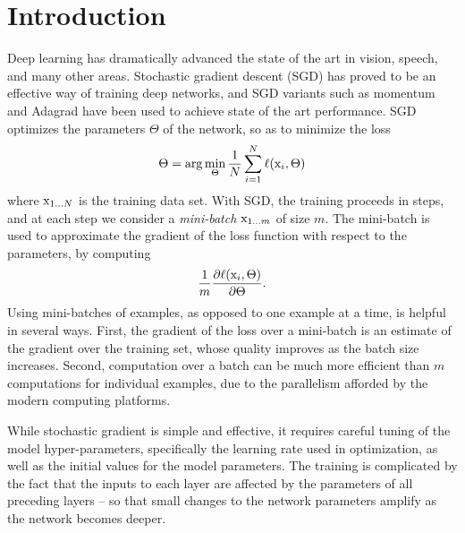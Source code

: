 \documentclass[twocolumn]{article}
\begin{document}
\section{Introduction}


Deep learning has dramatically advanced the state of the art in vision, speech,
and many other areas. Stochastic gradient descent (SGD) has proved to be an effective way of training
deep networks, and SGD variants such as momentum \cite{momentum} and Adagrad \cite{adagrad} have been used to
achieve state of the art performance. SGD optimizes the parameters $\Theta$ of
the network, so as to minimize the loss $$\Theta = \arg \min_\Theta
\frac{1}{N}\sum_{i=1}^N \ell(\mathrm{x}_i, \Theta)$$ where
$\mathrm{x}_{1\ldots N}$ is the training data set.  With SGD, the training
proceeds in steps, and at each step we consider a {\em mini-batch}
$\mathrm{x}_{1\ldots m}$ of size $m$. The mini-batch is used
to approximate the gradient of the loss function with respect to the parameters,
by computing $$\frac{1}{m} \frac{\partial  \ell(\mathrm{x}_i, \Theta)}{\partial  \Theta}.$$ Using
mini-batches of examples, as opposed to one example at a time, is helpful in
several ways. First, the gradient of the loss over a mini-batch is an estimate
of the gradient over the training set, whose quality  improves
as the batch size increases. Second, computation over a batch can be much more
efficient than $m$ computations for individual examples, due to the parallelism
afforded by the modern computing platforms.


While stochastic gradient is simple and effective, it requires careful tuning of
the model hyper-parameters, specifically the learning rate used in optimization,
as well as the initial values for the model parameters. The training is
complicated by the fact that the inputs to each layer are affected by the
parameters of all preceding layers -- so that
small changes to the network parameters amplify as the network becomes
deeper.
\end{document}
